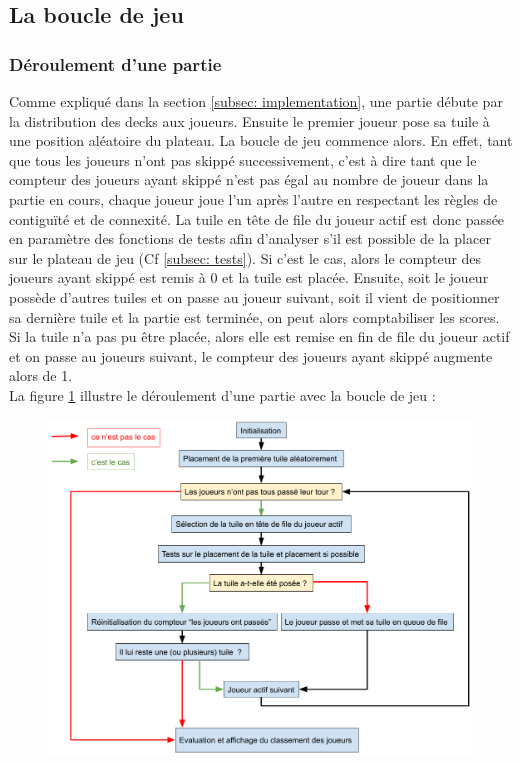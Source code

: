 \documentclass[11pt]{article}
\begin{document}
\subsection{La boucle de jeu}
\subsubsection{Déroulement d'une partie}
Comme expliqué dans la section \ref{subsec: implementation}, une partie débute par la distribution des decks aux joueurs. Ensuite le premier joueur pose sa tuile à une position aléatoire du plateau. La boucle de jeu commence alors. En effet, tant que tous les joueurs n'ont pas skippé successivement, c'est à dire tant que le compteur des joueurs ayant skippé n'est pas égal au nombre de joueur dans la partie en cours, chaque joueur joue l'un après l'autre en respectant les règles de contiguïté et de connexité. La tuile en tête de file du joueur actif est donc passée en paramètre des fonctions de tests afin d'analyser s'il est possible de la placer sur le plateau de jeu (Cf \ref{subsec: tests}). Si c'est le cas, alors le compteur des joueurs ayant skippé est remis à 0 et la tuile est placée. Ensuite, soit le joueur possède d'autres tuiles et on passe au joueur suivant, soit il vient de positionner sa dernière tuile et la partie est terminée, on peut alors comptabiliser les scores. Si la tuile n'a pas pu être placée, alors elle est remise en fin de file du joueur actif et on passe au joueurs suivant, le compteur des joueurs ayant skippé augmente alors de 1. \\
La figure \ref{fig : boucle} illustre le déroulement d'une partie avec la boucle de jeu :

\begin{figure}[H] 
\centering
\includegraphics[scale=0.45]{Boucle jeu.png}
\label{fig : boucle}
\end{figure}
\end{document}
